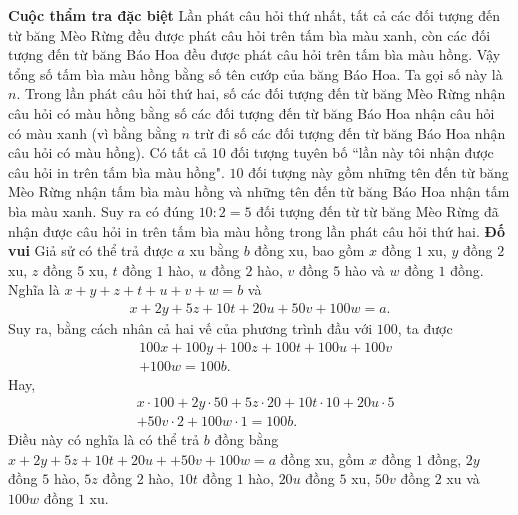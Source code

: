 \begin{multicols}{2}
	\textbf{\color{hoccungpi}Cuộc thẩm tra đặc biệt}
	\vskip 0.1cm
	Lần phát câu hỏi thứ nhất, tất cả các đối tượng đến từ băng Mèo Rừng đều được phát câu hỏi trên tấm bìa màu xanh, còn các đối tượng đến từ băng Báo Hoa đều được phát câu hỏi trên tấm bìa màu hồng. Vậy tổng số tấm bìa màu hồng bằng số tên cướp của băng Báo Hoa. Ta gọi số này là $n$.
	\vskip 0.1cm
	Trong lần phát câu hỏi thứ hai, số các đối tượng đến từ băng Mèo Rừng nhận câu hỏi có màu hồng  bằng số các đối tượng đến từ băng Báo Hoa nhận câu hỏi có màu xanh (vì bằng bằng $n$ trừ đi số các đối tượng đến từ băng Báo Hoa nhận câu hỏi có màu  hồng). 
	\vskip 0.1cm
	Có tất cả $10$ đối tượng tuyên bố ``lần này tôi nhận được câu hỏi in trên tấm bìa màu hồng". $10$ đối tượng này gồm những tên đến từ băng Mèo Rừng nhận tấm bìa màu hồng và những tên đến từ băng Báo Hoa nhận tấm bìa màu xanh. Suy ra có đúng $10:2 = 5$ đối tượng đến từ từ băng Mèo Rừng đã nhận được câu hỏi in trên tấm bìa màu hồng trong lần phát câu hỏi thứ hai.
	\vskip 0.1cm
	\textbf{\color{hoccungpi}Đố vui}
	\vskip 0.1cm
	Giả sử có thể trả được $a$ xu bằng $b$ đồng xu, bao gồm $x$ đồng $1$ xu, $y$ đồng $2$ xu, $z$ đồng $5$ xu, $t$ đồng $1$ hào, $u$ đồng $2$ hào, $v$ đồng $5$ hào và $w$ đồng $1$ đồng. Nghĩa là $x+y+z+t+u+v+w=b$ và
	\begin{align*}
		x+ 2y + 5z+ 10t + 20u+ 50v + 100w=a.
	\end{align*}
	Suy ra, bằng cách nhân cả hai vế của phương trình đầu với $100$, ta được 
	\begin{align*}
		&100x \!+\!100y\!+\!100z\!+\!100t\!+\! 100u \!+\! 100v \\
		&+\!100w\!=\!100b.
	\end{align*}
	Hay,
	\begin{align*} 
		&x\!\cdot\! 100 \!+\! 2y\!\cdot\! 50 \!+\! 5z\!\cdot\! 20 \!+\! 10 t \!\cdot\! 10 \!+\! 20u \!\cdot\! 5 \!\\
		&+\! 50v\!\cdot\! 2 \!+\! 100w \!\cdot\! 1\!=\! 100b.
	\end{align*} 
	Điều này có nghĩa là có thể trả $b$ đồng bằng $x+ 2y + 5z+ 10t +20u + +50v+ 100w=a$ đồng xu, gồm $x$ đồng $1$ đồng, $2y$ đồng $5$ hào, $5z$ đồng $2$ hào, $10t$ đồng $1$ hào, $20u$ đồng $5$ xu, $50v$ đồng $2$ xu và $100w$ đồng $1$ xu.
\end{multicols}